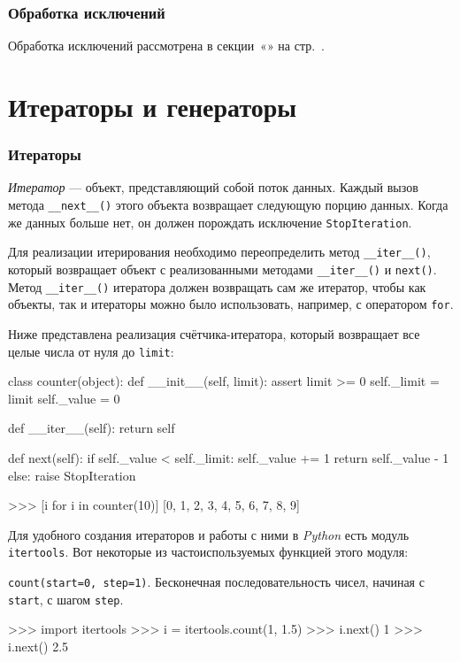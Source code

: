 \subsubsection{Обработка исключений}
Обработка исключений рассмотрена в секции~«» на стр.~\pageref{sec:py-try-stmt}.

\section{Итераторы и генераторы}
\label{sec:py-iterators}

\subsubsection{Итераторы}
\emph{Итератор} — объект, представляющий собой поток данных. Каждый вызов метода \lstinline{__next__()} этого объекта возвращает следующую порцию данных. Когда же данных больше нет, он должен порождать исключение \lstinline{StopIteration}.

Для реализации итерирования необходимо переопределить метод \lstinline{__iter__()}, который возвращает объект с реализованными методами \lstinline{__iter__()} и \lstinline{next()}. Метод \lstinline{__iter__()} итератора должен возвращать сам же итератор, чтобы как объекты, так и итераторы можно было использовать, например, с оператором \lstinline{for}.

Ниже представлена реализация счётчика-итератора, который возвращает все целые числа от нуля до \lstinline{limit}:
\begin{pylst}{}{}
class counter(object):
    def __init__(self, limit):
        assert limit >= 0
        self._limit = limit
        self._value = 0

    def __iter__(self):
        return self

    def next(self):
        if self._value < self._limit:
            self._value += 1
            return self._value - 1
        else:
            raise StopIteration

>>> [i for i in counter(10)]
[0, 1, 2, 3, 4, 5, 6, 7, 8, 9]
\end{pylst}

Для удобного создания итераторов и работы с ними в \emph{Python} есть модуль \lstinline{itertools}. Вот некоторые из частоиспользуемых функцией этого модуля:

\lstinline{count(start=0, step=1)}. Бесконечная последовательность чисел, начиная с \lstinline{start}, с шагом \lstinline{step}.
\begin{pylst}{}{}
>>> import itertools
>>> i = itertools.count(1, 1.5)
>>> i.next()
1
>>> i.next()
2.5
\end{pylst}


